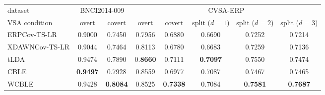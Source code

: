 \begin{tabular}{lccccccc}
\toprule
dataset & \multicolumn{2}{c}{BNCI2014-009} & \multicolumn{5}{c}{CVSA-ERP} \\
\cmidrule(lr){2-3} \cmidrule(lr){4-8}
VSA condition & overt & covert & overt & covert & split ($d=1$) & split ($d=2$) & split ($d=3$) \\
\midrule
ERPCov-TS-LR    & 0.9000     & 0.7450        & 0.7956     & 0.6880      & 0.6690      & 0.7252      & 0.7214 \\
XDAWNCov-TS-LR  & 0.9044     & 0.7464        & 0.8113     & 0.6780      & 0.6683      & 0.7259      & 0.7136 \\
tLDA            & 0.9474     & 0.7890        & 0.\bf 8660 & 0.7111      & \bf 0.7097      & 0.7550      & 0.7474 \\
CBLE            & \bf 0.9497 & 0.7928        & 0.8559     & 0.6977      & 0.7087  & 0.7467      & 0.7465 \\
WCBLE           & 0.9428     & \bf 0.8084    & 0.8525     & \bf 0.7338  & 0.7084      & \bf 0.7581  & \bf 0.7687 \\
\bottomrule
\end{tabular}

